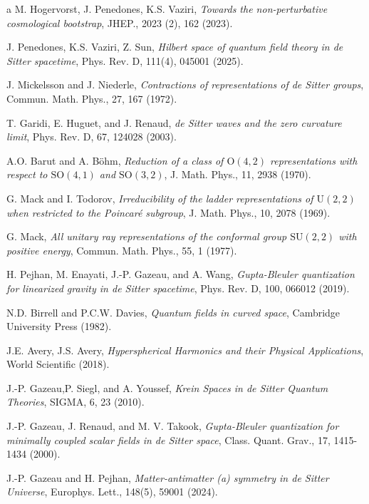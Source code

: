 \documentclass[aps,twocolumn,nofootinbib]{revtex4}
\begin{document}
{\begin{thebibliography}{a}
 M. Hogervorst, J. Penedones, K.S. Vaziri, \emph{Towards the non-perturbative cosmological bootstrap}, JHEP., 2023 (2), 162 (2023).

 J. Penedones, K.S. Vaziri, Z. Sun, \emph{Hilbert space of quantum field theory in de Sitter spacetime}, Phys. Rev. D, 111(4), 045001 (2025).

 J. Mickelsson and J. Niederle, \emph{Contractions of representations of de Sitter groups}, Commun. Math. Phys., 27, 167 (1972).

 T. Garidi, E. Huguet, and J. Renaud, \emph{de Sitter waves and the zero curvature limit}, Phys. Rev. D, 67, 124028 (2003).

 A.O. Barut and A. B\"{o}hm, \emph{Reduction of a class of $\mathrm{O}(4,2)$ representations with respect to $\mathrm{SO}(4,1)$ and $\mathrm{SO}(3,2)$}, J. Math. Phys., 11, 2938 (1970).

 G. Mack and I. Todorov, \emph{Irreducibility of the ladder representations of $\mathrm{U}(2,2)$ when restricted to the Poincar\'{e} subgroup}, J. Math. Phys., 10, 2078 (1969).

 G. Mack, \emph{All unitary ray representations of the conformal group $\mathrm{SU}(2,2)$ with positive energy}, Commun. Math. Phys., 55, 1 (1977).

 H. Pejhan, M. Enayati, J.-P. Gazeau, and A. Wang, \emph{Gupta-Bleuler quantization for linearized gravity in de Sitter spacetime}, Phys. Rev. D, 100, 066012 (2019).

 N.D. Birrell and P.C.W. Davies, \emph{Quantum fields in curved space}, Cambridge University Press (1982).

 J.E. Avery, J.S. Avery, \emph{Hyperspherical Harmonics and their Physical Applications}, World Scientific (2018).

 J.-P. Gazeau,P. Siegl, and A. Youssef, \emph{Krein Spaces in de Sitter Quantum Theories}, SIGMA, 6, 23 (2010).

 J.-P. Gazeau, J. Renaud, and M. V. Takook, \emph{Gupta-Bleuler quantization for minimally coupled scalar fields in de Sitter space}, Class. Quant. Grav., 17, 1415-1434 (2000).

 J.-P. Gazeau and H. Pejhan, \emph{Matter-antimatter (a) symmetry in de Sitter Universe}, Europhys. Lett., 148(5), 59001 (2024).


\end{thebibliography}}
\end{document}
